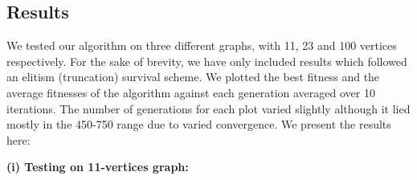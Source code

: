\documentclass[conference,compsoc]{IEEEtran}
\begin{document}
\subsection{Results} \label{results}
We tested our algorithm on three different graphs, with 11, 23 and 100 vertices respectively. 
For the sake of brevity, we have only included results which followed an elitism (truncation) survival scheme. 
We plotted the best fitness and the average fitnesses of the algorithm against each generation 
averaged over 10 iterations. The number of generations for each plot varied slightly although it lied 
mostly in the 450-750 range due to varied convergence. We present the results here:
\setlength{\parskip}{1 em}
\newpage
\begin{center}
  \textbf{(i) Testing on 11-vertices graph:}
\end{center}
\setlength{\parskip}{0 em}
\end{document}

